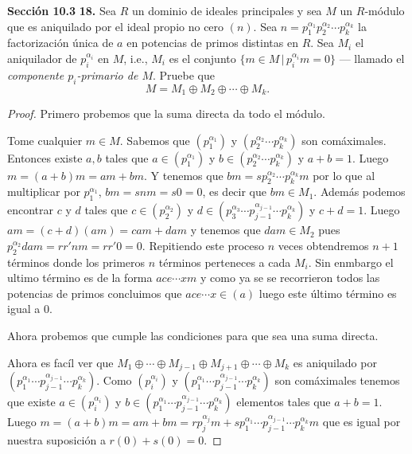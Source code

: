 \documentclass[letter,twoside,12pt]{article}
\begin{document}
\textbf{Sección 10.3} \textbf{18.}
Sea $ R $ un dominio de ideales principales y sea $ M $ un $ R $-módulo que es aniquilado por el ideal propio no cero $ (n) $. Sea $ n = p_1^{\alpha_1}p_2^{\alpha_2}\cdots p_k^{\alpha_k} $ la factorización única de $ a $ en potencias de primos distintas en $ R $. Sea $ M_i $ el aniquilador de $ p_i^{\alpha_i} $ en $ M $, i.e., $ M_i $ es el conjunto $ \{ m \in M \,|\,p_i^{\alpha_i}m=0 \} $ --- llamado el \textit{componente $ p_i $-primario de $ M $}. Pruebe que
\begin{equation}
M = M_1 \oplus M_2 \oplus \cdots \oplus M_k. \nonumber
\end{equation}
\begin{proof}
Primero probemos que la suma directa da todo el módulo.

Tome cualquier $m \in M$. Sabemos que   $ (p_1^{\alpha_1}) $ y $ (p_2^{\alpha_2} \cdots p_{k}^{\alpha_k} ) $ son comáximales. Entonces existe $ a,b $ tales que  $ a \in(p_1^{\alpha_1}) $ y $ b \in (p_2^{\alpha_2} \cdots p_{k}^{\alpha_k} )$ y $ a+b = 1 $. Luego $ m = (a+b)m = am+bm $. Y tenemos que $ bm = sp_2^{\alpha_2} \cdots p_{k}^{\alpha_k}m $ por lo que al multiplicar por $ p_1^{\alpha_1} $, $ bm = snm = s0 = 0 $, es decir que $ bm \in M_1 $. Además podemos encontrar $ c $ y $ d $ tales que  $ c \in(p_2^{\alpha_2}) $ y $ d \in (p_3^{\alpha_3} \cdots p_{j-1}^{\alpha_{j-1}}\cdots p_{k}^{\alpha_k})$ y $ c+d = 1 $. Luego $ am = (c+d)(am)=cam+dam$ y tenemos que $ dam \in M_2 $ pues $ p_2^{\alpha_2}dam = rr'nm = rr'0 = 0$. Repitiendo este proceso $ n $ veces obtendremos $n+1$ términos donde los primeros $ n $ términos perteneces a cada $ M_i $. Sin enmbargo el ultimo término es de la forma $ ace \cdots xm$ y como ya se se recorrieron todos las potencias de primos concluimos que $ ace \cdots x \in (a)$ luego este último término es igual a 0. 

Ahora probemos que cumple las condiciones para que sea una suma directa.

Ahora es facíl ver que  $M_1 \oplus \cdots \oplus M_{j-1} \oplus M_{j+1} \oplus \cdots \oplus M_k$ es aniquilado por $ (p_1^{\alpha_1} \cdots p_{j-1}^{\alpha_{j-1}}\cdots p_{k}^{\alpha_k} ) $. Como $ (p_i^{\alpha_i}) $ y $ (p_1^{\alpha_1} \cdots p_{j-1}^{\alpha_{j-1}}\cdots p_{k}^{\alpha_k} ) $ son comáximales tenemos que existe $ a \in(p_i^{\alpha_i}) $ y $ b \in (p_1^{\alpha_1} \cdots p_{j-1}^{\alpha_{j-1}}\cdots p_{k}^{\alpha_k} )$ elementos tales que $ a+b=1 $. Luego $ m = (a+b)m = am+ bm = rp_j^{\alpha_j}m+sp_1^{\alpha_1} \cdots p_{j-1}^{\alpha_{j-1}}\cdots p_{k}^{\alpha_k}m $ que es igual por nuestra suposición a $ r(0)+s(0) = 0 $.

 
\end{proof}
\end{document}
